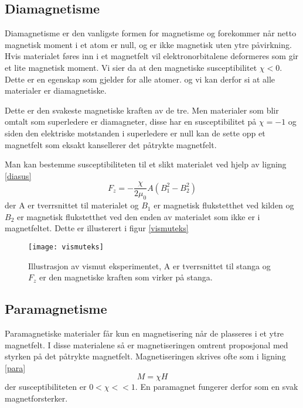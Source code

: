 \documentclass[norsk,a4paper,12pt]{article}
\begin{document}
\subsection{Diamagnetisme}
Diamagnetisme er den vanligste formen for magnetisme og forekommer når netto magnetisk moment i et atom er null, og er ikke magnetisk uten ytre påvirkning. Hvis materialet føres inn i et magnetfelt vil elektronorbitalene deformeres som gir et lite magnetisk moment. Vi sier da at den magnetiske susceptibilitet  $\chi < 0$. Dette er en egenskap som gjelder for alle atomer. og vi kan derfor si at alle materialer er diamagnetiske. 

Dette er den svakeste magnetiske kraften av de tre. Men materialer som blir omtalt som superledere er diamagneter, disse har en susceptibilitet på $\chi = -1$ og siden den elektriske motstanden i superledere er null kan de sette opp et magnetfelt som eksakt kansellerer det påtrykte magnetfelt. 

Man kan bestemme susceptibiliteten til et slikt materialet ved hjelp av ligning \vref{diasus}
\begin{equation}
F_z = -\frac{\chi}{2\mu_0}A(B_1^2 - B_2^2)
\label{diasus}
\end{equation}
der A er tverrsnittet til materialet og $B_1$ er magnetisk flukstetthet ved kilden og $B_2$ er magnetisk flukstetthet ved den enden av materialet som ikke er i magnetfeltet. Dette er illusterert i figur \vref{vismuteks}
\begin{figure}[h!]
	\begin{center}
  	\texttt{[image: vismuteks]}\\
	\caption[Illustrasjon av vismut eksperimentet]{Illustrasjon av vismut eksperimentet, A er tverrsnittet til stanga og $F_z$ er den magnetiske kraften som virker på stanga.}
	\label{vismuteks}
	\end{center}
\end{figure}

\subsection{Paramagnetisme}
Paramagnetiske materialer får kun en magnetisering når de plasseres i et ytre magnetfelt. I disse materialene så er magnetiseringen omtrent proposjonal med styrken på det påtrykte magnetfelt. Magnetiseringen skrives ofte som i ligning \ref{para}
\begin{equation}
M = \chi H
\label{para}
\end{equation}
der susceptibiliteten er $0<\chi<<1$. En paramagnet fungerer derfor som en svak magnetforsterker. 
\end{document}
